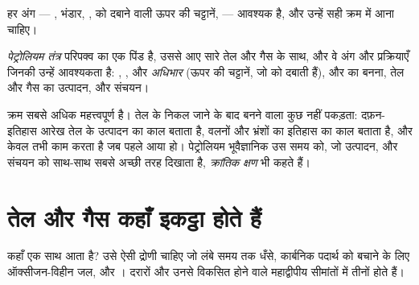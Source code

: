 हर अंग --- , भंडार, ,  को दबाने वाली ऊपर की
चट्टानें,  --- आवश्यक है, और उन्हें सही
क्रम में आना चाहिए।

\begin{definition}[पेट्रोलियम तंत्र]\label{def:g11:fossil-fuel-geology:petroleum-system}
\emph{पेट्रोलियम तंत्र} परिपक्व  का एक पिंड है,
उससे आए सारे तेल और गैस के साथ, और वे अंग
और प्रक्रियाएँ जिनकी उन्हें आवश्यकता है: , ,  और
\emph{अधिभार} (ऊपर की चट्टानें, जो  को
दबाती हैं), और  का बनना, तेल और गैस का उत्पादन,  और
संचयन।
\end{definition}

क्रम सबसे अधिक महत्त्वपूर्ण है। तेल के निकल जाने के बाद बनने वाला  कुछ नहीं
पकड़ता: दफ़न-इतिहास आरेख तेल के उत्पादन का काल बताता है, वलनों और भ्रंशों का
इतिहास  का काल बताता है, और  केवल तभी काम करता है
जब  पहले आया हो। पेट्रोलियम भूवैज्ञानिक उस समय को, जो उत्पादन,  और
संचयन को साथ-साथ सबसे अच्छी तरह दिखाता है, \emph{क्रांतिक
क्षण} भी कहते हैं।

\section{तेल और गैस कहाँ इकट्ठा होते हैं}

 कहाँ एक साथ आता है? उसे ऐसी द्रोणी चाहिए जो
लंबे समय तक धँसे, कार्बनिक पदार्थ को बचाने के लिए ऑक्सीजन-विहीन जल, और । दरारों
और उनसे विकसित होने वाले महाद्वीपीय सीमांतों में तीनों होते हैं।

